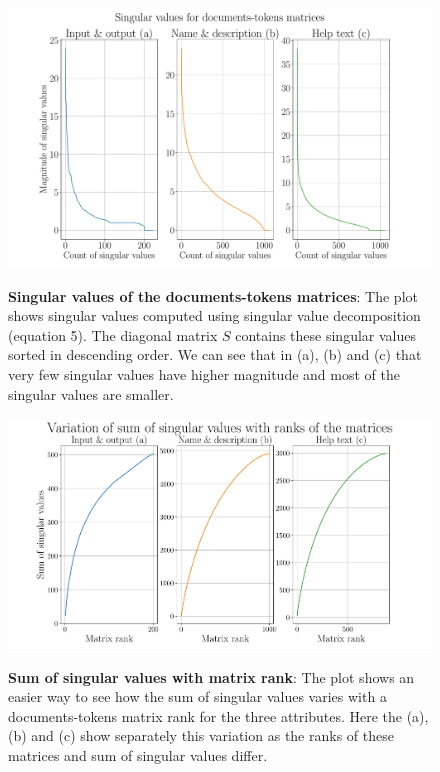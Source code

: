 \begin{figure}[h]
\begin{centering}
    {\includegraphics[scale=0.37]{figures/Singular_values.pdf}}
    \caption[Singular values of documents-tokens matrices]{\textbf{Singular values of the documents-tokens matrices}: The plot shows singular values computed using singular value decomposition (equation 5). The diagonal matrix $S$ contains these singular values sorted in descending order. We can see that in (a), (b) and (c) that very few singular values have higher magnitude and most of the singular values are smaller.}
\end{centering}
\end{figure}

\begin{figure}[h]
\begin{centering}
    {\includegraphics[scale=0.45]{figures/Sum_singular_ranks.pdf}}
    \caption[Singular values of documents-tokens matrices with their respective ranks]{\textbf{Sum of singular values with matrix rank}: The plot shows an easier way to see how the sum of singular values varies with a documents-tokens matrix rank for the three attributes. Here the (a), (b) and (c) show separately this variation as the ranks of these matrices and sum of singular values differ.}
\end{centering}
\end{figure}

